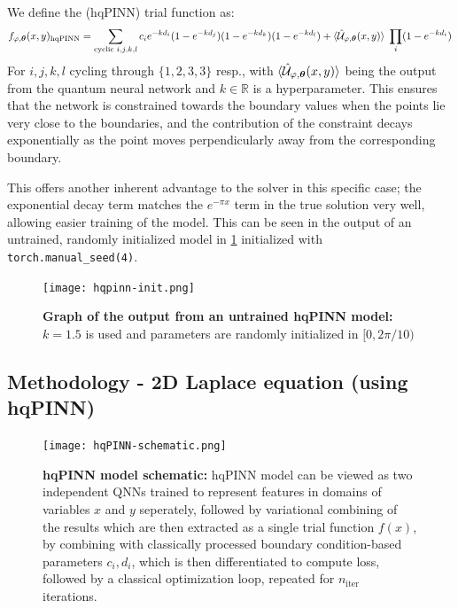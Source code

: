 \documentclass[11pt,a4paper]{article}
\begin{document}
{We define the (hqPINN) trial function as:
$$
f_{\varphi,\boldsymbol{\theta}}(x,y)_{\text{hqPINN}} = \sum_{\text{cyclic } i,j,k,l} c_{i} e^{-k d_{i}} (1 - e^{-k d_{j}}) (1 - e^{-k d_{k}}) (1 - e^{-k d_{l}}) + \braket{\mathcal{\hat{U}}_{\varphi,\boldsymbol{\theta}}(x,y)} \;\prod_i (1 - e^{-k d_{i}})
$$
For $i,j,k,l$ cycling through $\{1,2,3,3\}$ resp., with $\braket{\mathcal{\hat{U}}_{\varphi,\boldsymbol{\theta}}(x,y)}$ being the output from the quantum neural network and $k \in \mathbb{R}$ is a hyperparameter.
This ensures that the network is constrained towards the boundary values when the points lie very close to the boundaries, and the contribution of the constraint decays exponentially as the point moves perpendicularly away from the corresponding boundary.

This offers another inherent advantage to the solver in this specific case; the exponential decay term matches the $ e^{-\pi x}$ term in the true solution very well, allowing easier training of the model. This can be seen in the output of an untrained, randomly initialized model in \ref{fig:hqpinn-init} initialized with \texttt{torch.manual\_seed(4)}.

\begin{figure}[H]
    \centering
    \texttt{[image: hqpinn-init.png]}
    \caption{\justifying\textbf{Graph of the output from an untrained hqPINN model:} $k = 1.5$ is used and parameters are randomly initialized in $[0, 2\pi / 10)$}
    \label{fig:hqpinn-init}
\end{figure}

\subsection{Methodology - 2D Laplace equation (using hqPINN)}

\begin{figure}[H]
    \centering
    \texttt{[image: hqPINN-schematic.png]}
    \caption{\justifying\textbf{hqPINN model schematic:}
    hqPINN model can be viewed as two independent QNNs trained to represent features in domains of variables $x$ and $y$ seperately, followed by variational combining of the results which are then extracted as a single trial function $f(x)$, by combining with classically processed boundary condition-based parameters $c_i, d_i$, which is then differentiated to compute loss, followed by a classical optimization loop, repeated for $n_{\text{iter}}$ iterations.}
    \label{fig:hqpinn-schematic}
\end{figure}

}
\end{document}
